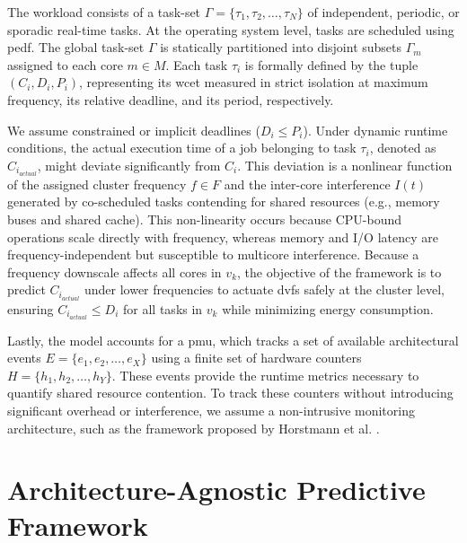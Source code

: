 \documentclass[journal]{IEEEtran}
\begin{document}
The workload consists of a task-set $\Gamma = \{\tau_1, \tau_2, \dots, \tau_N\}$ of independent, periodic, or sporadic real-time tasks. At the operating system level, tasks are scheduled using \gls{pedf}. The global task-set $\Gamma$ is statically partitioned into disjoint subsets $\Gamma_m$ assigned to each core $m \in M$. Each task $\tau_i$ is formally defined by the tuple $(C_i, D_i, P_i)$, representing its \gls{wcet} measured in strict isolation at maximum frequency, its relative deadline, and its period, respectively.

We assume constrained or implicit deadlines ($D_i \le P_i$). Under dynamic runtime conditions, the actual execution time of a job belonging to task $\tau_i$, denoted as $C_{i_{actual}}$, might deviate significantly from $C_i$. This deviation is a nonlinear function of the assigned cluster frequency $f \in F$ and the inter-core interference $I(t)$ generated by co-scheduled tasks contending for shared resources (e.g., memory buses and shared cache). This non-linearity occurs because CPU-bound operations scale directly with frequency, whereas memory and I/O latency are frequency-independent but susceptible to multicore interference. Because a frequency downscale affects all cores in $v_k$, the objective of the framework is to predict $C_{i_{actual}}$ under lower frequencies to actuate \gls{dvfs} safely at the cluster level, ensuring $C_{i_{actual}} \le D_i$ for all tasks in $v_k$ while minimizing energy consumption.

Lastly, the model accounts for a \gls{pmu}, which tracks a set of available architectural events ${E = \{e_1, e_2, \dots, e_X\}}$ using a finite set of hardware counters $H = \{h_1, h_2, \dots, h_Y\}$. These events provide the runtime metrics necessary to quantify shared resource contention. To track these counters without introducing significant overhead or interference, we assume a non-intrusive monitoring architecture, such as the framework proposed by Horstmann et al. \cite{passig2023monitoring}.

\section{Architecture-Agnostic Predictive Framework}
\end{document}
